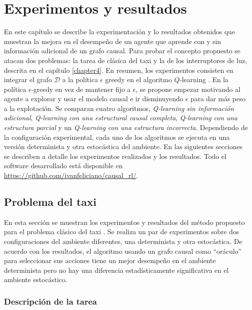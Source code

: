 \chapter{Experimentos y resultados}\label{chapter5}

\graphicspath{{Chapter5/Figs/}}


En este capítulo se describe la experimentación y lo resultados obtenidos
que muestran la mejora en el desempeño de un agente que aprende
con y sin información adicional de un grafo causal.
Para probar el concepto propuesto se atacan dos problemas: la tarea de clásica del taxi \cite{Dietterich:2000:HRL:1622262.1622268} y la de los
interruptores de luz, descrita en el capítulo \ref{chapter4}.
En resumen, los experimentos consisten en integrar el grafo $\mathcal{D}$ a la política $\epsilon$ greedy
en el algoritmo $Q$-learning \cite{watkins1992q}.
En la política $\epsilon$-greedy en vez de mantener fijo a $\epsilon$, se propone empezar motivando al agente a explorar y usar
el modelo causal e ir disminuyendo $\epsilon$ para dar más peso a la explotación.
Se comparan cuatro algoritmos, \textit{Q-learning sin información
adicional}, \textit{Q-learning con una estructural causal completa}, \textit{Q-learning con una estructura parcial} y un \textit{Q-learning con una estructura incorrecta}.
Dependiendo de la configuración experimental, cada uno de los algoritmos se ejecuta en una versión determinista y otra estocástica del ambiente. 
En las siguientes secciones se describen a detalle los experimentos realizados y los resultados. Todo el software desarrollado está 
disponible en \url{https://github.com/ivanfeliciano/causal_rl/}.


\section{Problema del taxi}

En esta sección se muestran los experimentos y resultados del método propuesto para el problema clásico del taxi \cite{Dietterich:2000:HRL:1622262.1622268}.
Se realiza un par de experimentos sobre dos configuraciones del ambiente diferentes,
una determinista y otra estocástica. De acuerdo con los resultados, 
el algoritmo usando un grafo causal como ``oráculo'' para seleccionar sus acciones
tiene un mejor desempeño en el ambiente determinista pero no hay una diferencia estadísticamente significativa en el ambiente estocástico.

\subsection{Descripción de la tarea}

